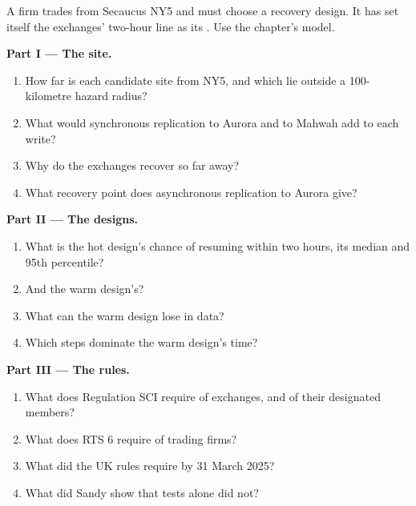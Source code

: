 \begin{problem}\label{pb:nw:disaster-recovery-and-regulatory-requirements:1}
A firm trades from Secaucus NY5 and must choose a recovery design. It has set itself the exchanges' two-hour line as its . Use the chapter's model.

\medskip\noindent\textbf{Part I --- The site.}
\begin{enumerate}
\item How far is each candidate site from NY5, and which lie outside a 100-kilometre hazard radius?
\item What would synchronous replication to Aurora and to Mahwah add to each write?
\item Why do the exchanges recover so far away?
\item What recovery point does asynchronous replication to Aurora give?
\end{enumerate}

\medskip\noindent\textbf{Part II --- The designs.}
\begin{enumerate}[resume]
\item What is the hot design's chance of resuming within two hours, its median and 95th percentile?
\item And the warm design's?
\item What can the warm design lose in data?
\item Which steps dominate the warm design's time?
\end{enumerate}

\medskip\noindent\textbf{Part III --- The rules.}
\begin{enumerate}[resume]
\item What does Regulation SCI require of exchanges, and of their designated members?
\item What does RTS 6 require of trading firms?
\item What did the UK rules require by 31 March 2025?
\item What did Sandy show that tests alone did not?
\end{enumerate}


\end{problem}
